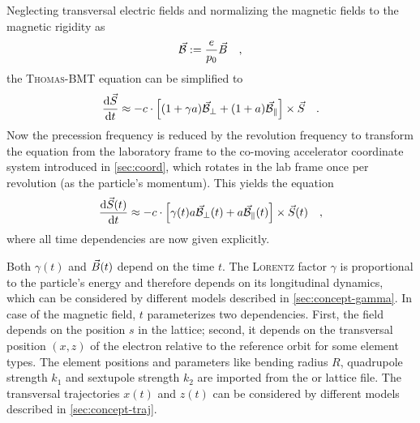 \documentclass[a4paper]{scrartcl}
\begin{document}
Neglecting transversal electric fields and normalizing the magnetic fields to the magnetic
rigidity as
\begin{equation}
\label{eq:Bn}
  \vec{\mathcal{B}}_{} := \frac{e}{p_0} \vec{B} \quad,
\end{equation}
the \textsc{Thomas-BMT} equation can be simplified to
\begin{equation}
  \label{eq:tbmt-short}
  \frac{\text{d} \vec{S}_{}}{\text{d} t} \approx - c\cdot \left[ (1+\gamma a)\vec{\mathcal{B}}_{\bot} + (1+a)\vec{\mathcal{B}}_{\parallel} \right]
  \times\vec{S}_{} \quad.
\end{equation}
Now the precession frequency is reduced by the revolution frequency \wrev to transform the
equation from the laboratory frame to the co-moving accelerator coordinate system
introduced in \cref{sec:coord}, which rotates in the lab frame once per
revolution (as the particle's momentum). This yields the equation
\begin{equation}
  \label{eq:tbmt-pole}
  \frac{\text{d} \vec{S}_{}(t)}{\text{d} t} \approx - c\cdot \left[ \gamma(t)a\vec{\mathcal{B}}_{\bot}(t) + a\vec{\mathcal{B}}_{\parallel}(t) \right]
  \times\vec{S}_{}(t) \quad,
\end{equation}
where all time dependencies are now given explicitly.

Both $\gamma(t)$ and $\vec{B}(t)$ depend on the time $t$. The \textsc{Lorentz} factor
$\gamma$ is proportional to the particle's energy and therefore depends on its
longitudinal dynamics, which can be considered by different models described in
\cref{sec:concept-gamma}.
%
In case of the magnetic field, $t$ parameterizes two dependencies. First, the field
depends on the position $s$ in the lattice; second, it depends on the transversal position
$(x,z)$ of the electron relative to the reference orbit for some element types. The
element positions and parameters like bending radius $R$, quadrupole strength $k_1$ and
sextupole strength $k_2$ are imported from the \ele or \madx lattice file. The transversal
trajectories $x(t)$ and $z(t)$ can be considered by different models described in
\cref{sec:concept-traj}.
\end{document}
